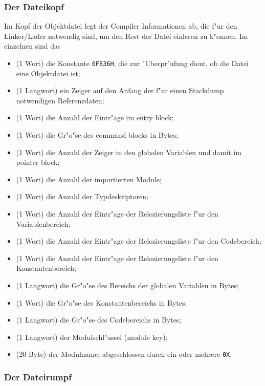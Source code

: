 \subsubsection{Der Dateikopf}

Im Kopf der Objektdatei legt der Compiler Informationen ab, die
f"ur den Linker/Lader notwendig sind, um den Rest der Datei einlesen
zu k"onnen.
Im einzelnen sind das
\begin{itemize}
\item (1 Wort) die Konstante {\tt 0F836H},
  die zur "Uberpr"ufung dient, ob die Datei eine Objektdatei ist;
\item (1 Langwort) ein Zeiger auf den Anfang der f"ur einen Stackdump
  notwendigen Referenzdaten;
\item (1 Wort) die Anzahl der Eintr"age im entry block;
\item (1 Wort) die Gr"o"se des command blocks in Bytes;
\item (1 Wort) die Anzahl der Zeiger in den globalen Variablen und damit im
  pointer block;
\item (1 Wort) die Anzahl der importierten Module;
\item (1 Wort) die Anzahl der Typdeskriptoren;
\item (1 Wort) die Anzahl der Eintr"age der Relozierungsliste f"ur den
  Variablenbereich;
\item (1 Wort) die Anzahl der Eintr"age der Relozierungsliste f"ur den
  Codebereich;
\item (1 Wort) die Anzahl der Eintr"age der Relozierungsliste f"ur den
  Konstantenbereich;
\item (1 Langwort) die Gr"o"se des Bereichs der globalen Variablen in Bytes;
\item (1 Wort) die Gr"o"se des Konstantenbereichs in Bytes;
\item (1 Langwort) die Gr"o"se des Codebereichs in Bytes;
\item (1 Langwort) der Modulschl"ussel (module key);
\item (20 Byte) der Modulname, abgeschlossen durch ein oder mehrere {\tt 0X}.
\end{itemize}

\subsubsection{Der Dateirumpf}

